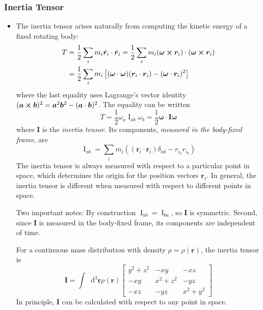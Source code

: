 \documentclass[11pt, a4paper]{article}
\newcommand{\diff}{\mathop{}\!\mathrm{d}} %
\newcommand{\bdot}[1]{\dot{\bm{#1}}} %
\newcommand{\mat}[1]{\mathbf{#1}} %
\begin{document}
\subsubsection{Inertia Tensor}
\begin{itemize}
	\item The inertia tensor arises naturally from computing the kinetic energy of a fixed rotating body:
	\begin{align*}
		T &= \frac{1}{2}\sum_{i} m_{i} \bdot{r}_{i} \cdot \bdot{r}_{i} = \frac{1}{2}\sum_{i} m_{i} (\bm{\omega} \cross \bm{r}_{i}) \cdot (\bm{\omega} \cross \bm{r}_{i})\\
		&= \frac{1}{2}\sum_{i} m_{i}\left[ (\bm{\omega} \cdot \bm{\omega}) (\bm{r}_{i} \cdot \bm{r}_{i} ) - (\bm{\omega} \cdot \bm{r}_{i})^2\right]
	\end{align*}
	where the last equality uses Lagrange's vector identity $ (\bm{a}\cross \bm{b})^{2} = \bm{a}^{2}\bm{b}^{2} - (\bm{a}\cdot \bm{b})^{2}$. The equality can be written 
	\begin{equation*}
		T = \frac{1}{2} \omega_{a} \operatorname{I}_{ab} \omega_{b} = \frac{1}{2} \bm{\omega} \cdot \mat{I} \bm{\omega}
	\end{equation*}
	where $ \mathbf{I} $ is the \textit{inertia tensor}. Its components, \textit{measured in the body-fixed frame}, are
	\begin{equation*}
		\operatorname{I}_{ab} = \sum_{i}m_{i} \left((\bm{r}_{i} \cdot \bm{r}_{i})\delta_{a b} - r_{i_{a}} r_{i_{b}} \right)
	\end{equation*}
	The inertia tensor is always measured with respect to a particular point in space, which determines the origin for the position vectors $ \bm{r}_{i} $. In general, the inertia tensor is different when measured with respect to different points in space. 
	
	Two important notes: By construction $ \operatorname{I}_{ab} = \operatorname{I}_{ba} $, so $ \mat{I} $ is symmetric. Second, since $ \mat{I} $ is measured in the body-fixed frame, its components are independent of time.
	
	
	For a continuous mass distribution with density $ \rho = \rho(\bm{r}) $, the inertia tensor is
	\[
		\mathbf{I} = \int \diff^{3}\bm{r} \rho(\bm{r}) 
		\begin{bmatrix}
			y^2 + z^2 & - xy & - xz\\
			-xy & x^2 + z^2 & -yz\\
			-xz & -yz & x^2 + y^2
		\end{bmatrix}
	\]
	In principle, $ \mathbf{I} $ can be calculated with respect to any point in space.
	

\end{itemize}
\end{document}
